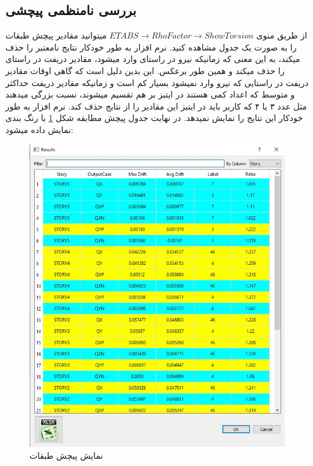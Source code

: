 \subsection{بررسی نامنظمی پیچشی}
از طریق منوی 
$ETABS \rightarrow Rho Factor \rightarrow Show Torsion$
میتوانید مقادیر پیچش طبقات را به صورت یک جدول مشاهده کنید. نرم افزار به طور خودکار نتایج نامعتبر را حذف میکند، به این معنی که زمانیکه نیرو در راستای 
وارد میشود، مقادیر دریفت در راستای  را حذف میکند و همین طور برعکس. این بدین دلیل است که گاهی اوقات مقادیر دریفت در راستایی که نیرو وارد نمیشود
بسیار کم است و زمانیکه مقادیر دریفت حداکثر و متوسط که اعداد کمی هستند در ایتبز بر هم تقسیم میشوند،‌ نسبت بزرگی میدهند مثل عدد ۳ یا ۴ که کاربر باید در ایتبز این
مقادیر را از نتایج حذف کند. نرم افزار به طور خودکار این نتایج را نمایش نمیدهد. در نهایت جدول پیچش مطابقه شکل 
\ref{pic:torsion}
با رنگ بندی نمایش داده میشود:

\begin{figure}[H]
    \centering
    \includegraphics[scale=0.7]{figures/torsion_table}
    \caption{نمایش پیچش طبقات}
    \label{pic:torsion}
\end{figure}

